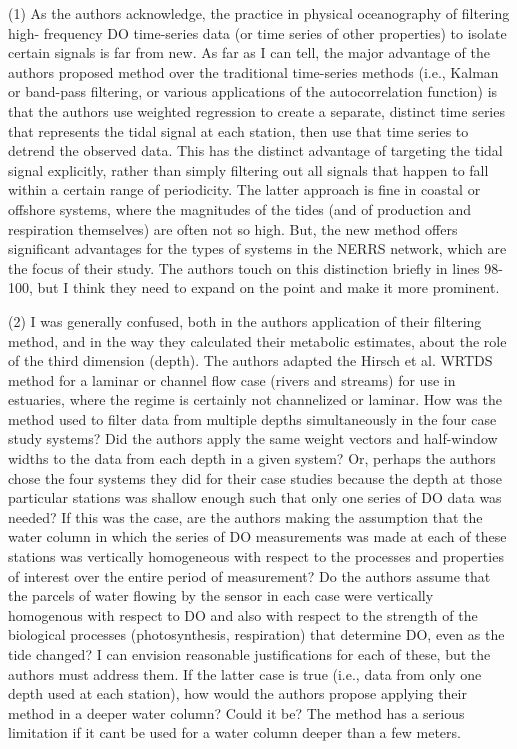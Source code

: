 \documentclass[letterpaper,12pt]{article}\usepackage[]{graphicx}\usepackage[]{color}
\begin{document}
(1) As the authors acknowledge, the practice in physical oceanography of filtering high- frequency DO time-series data (or time series of other properties) to isolate certain signals is far from new. As far as I can tell, the major advantage of the authors proposed method over the traditional time-series methods (i.e., Kalman or band-pass filtering, or various applications of the autocorrelation function) is that the authors use weighted regression to create a separate, distinct time series that represents the tidal signal at each station, then use that time series to detrend the observed data. This has the distinct advantage of targeting the tidal signal explicitly, rather than simply filtering out all signals that happen to fall within a certain range of periodicity. The latter approach is fine in coastal or offshore systems, where the magnitudes of the tides (and of production and respiration themselves) are often not so high. But, the new method offers significant advantages for the types of systems in the NERRS network, which are the focus of their study. The authors touch on this distinction briefly in lines 98-100, but I think they need to expand on the point and make it more prominent.

(2) I was generally confused, both in the authors application of their filtering method, and in the way they calculated their metabolic estimates, about the role of the third dimension (depth). The authors adapted the Hirsch et al. WRTDS method for a laminar or channel flow case (rivers and streams) for use in estuaries, where the regime is certainly not channelized or laminar. How was the method used to filter data from multiple depths simultaneously in the four case study
systems? Did the authors apply the same weight vectors and half-window widths to the data from each depth in a given system? Or, perhaps the authors chose the four systems they did for their case studies because the depth at those particular stations was shallow enough such that only one series of DO data was needed? If this was the case, are the authors making the assumption that
the water column in which the series of DO measurements was made at each of these stations was vertically homogeneous with respect to the processes and properties of interest over the entire period of measurement? Do the authors assume that the parcels of water flowing by the sensor in each case were vertically homogenous with respect to DO and also with respect to the strength of the biological processes (photosynthesis, respiration) that determine DO, even as the tide changed? I can envision reasonable justifications for each of these, but the authors must address them. If the latter case is true (i.e., data from only one depth used at each station), how would the authors propose applying their method in a deeper water column? Could it be? The method has a serious limitation if it cant be used for a water column deeper than a few meters.
\end{document}
